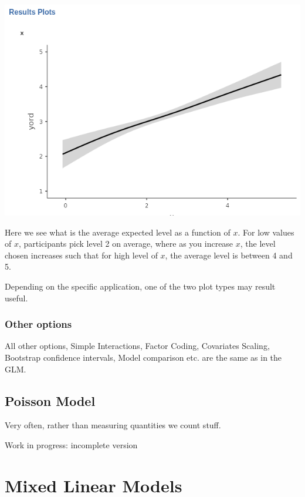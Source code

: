 \documentclass[
]{book}
\begin{document}
\includegraphics[width=8.69in]{bookletpics/3_ordinal_plot2}

Here we see what is the average expected level as a function of \(x\). For low values of \(x\), participants pick level 2 on average, where as you increase \(x\), the level chosen increases such that for high level of \(x\), the average level is between 4 and 5.

Depending on the specific application, one of the two plot types may result useful.

\hypertarget{other-options-2}{%
\subsection{Other options}\label{other-options-2}}

All other options, {Simple Interactions}, {Factor Coding}, {Covariates Scaling}, {Bootstrap} confidence intervals, {Model comparison} etc. are the same as in the GLM.

\hypertarget{poisson-model}{%
\section{Poisson Model}\label{poisson-model}}

Very often, rather than measuring quantities we count stuff.

{ Work in progress: incomplete version }

\hypertarget{mixed}{%
\chapter{Mixed Linear Models}\label{mixed}}
\end{document}
